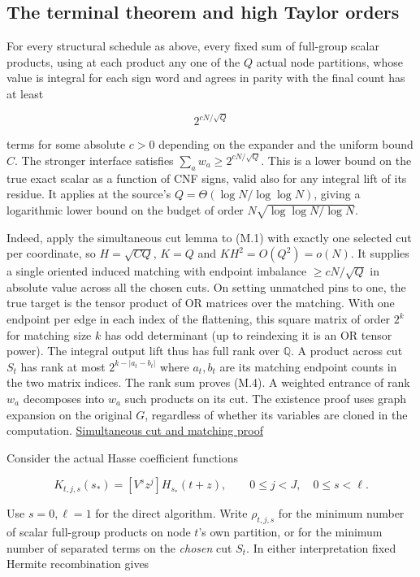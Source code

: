 \documentclass[
  11pt,
]{article}
\begin{document}
\subsection{The terminal theorem and high Taylor
orders}\label{the-terminal-theorem-and-high-taylor-orders}

For every structural schedule as above, every fixed sum of full-group
scalar products, using at each product any one of the \(Q\) actual node
partitions, whose value is integral for each sign word and agrees in
parity with the final count has at least

\[
   2^{cN/\sqrt Q}
\tag{M.4}
\]

terms for some absolute \(c>0\) depending on the expander and the
uniform bound \(C\). The stronger interface satisfies
\(\sum_a w_a\ge2^{cN/\sqrt Q}\). This is a lower bound on the true exact
scalar as a function of CNF signs, valid also for any integral lift of
its residue. It applies at the source's \(Q=\Theta(\log N/\log\log N)\),
giving a logarithmic lower bound on the budget of order
\(N\sqrt{\log\log N/\log N}\).

Indeed, apply the simultaneous cut lemma to (M.1) with exactly one
selected cut per coordinate, so \(H=\sqrt{CQ}\), \(K=Q\) and
\(KH^2=O(Q^2)=o(N)\). It supplies a single oriented induced matching
with endpoint imbalance \(\ge cN/\sqrt Q\) in absolute value across all
the chosen cuts. On setting unmatched pins to one, the true target is
the tensor product of OR matrices over the matching. With one endpoint
per edge in each index of the flattening, this square matrix of order
\(2^k\) for matching size \(k\) has odd determinant (up to reindexing it
is an OR tensor power). The integral output lift thus has full rank over
\(\mathbb Q\). A product across cut \(S_t\) has rank at most
\(2^{k-|a_t-b_t|}\) where \(a_t,b_t\) are its matching endpoint counts
in the two matrix indices. The rank sum proves (M.4). A weighted
entrance of rank \(w_a\) decomposes into \(w_a\) such products on its
cut. The existence proof uses graph expansion on the original \(G\),
regardless of whether its variables are cloned in the computation.
\href{https://github.com/dch-and-Elara/some-research-inspired-by-openais-eth-preprint/tree/main/root-separation}{Simultaneous cut and
matching proof}

Consider the actual Hasse coefficient functions

\[
 K_{t,j,s}(s_*)=[V^s z^j]H_{s_*}(t+z),\qquad 0\le j<J,\quad 0\le s<\ell.
\]

Use \(s=0,\ell=1\) for the direct algorithm. Write \(\rho_{t,j,s}\) for
the minimum number of scalar full-group products on node \(t\)'s own
partition, or for the minimum number of separated terms on the
\emph{chosen} cut \(S_t\). In either interpretation fixed Hermite
recombination gives
\end{document}
